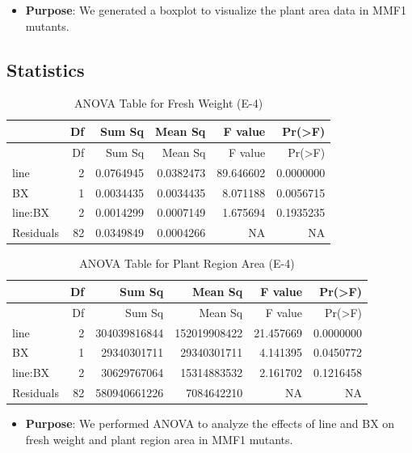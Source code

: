 \documentclass[
  10pt,
]{article}
\providecommand{\tightlist}{%
  \setlength{\itemsep}{0pt}\setlength{\parskip}{0pt}}\usepackage{longtable,booktabs,array}
\begin{document}
\begin{itemize}
\tightlist
\item
  \textbf{Purpose}: We generated a boxplot to visualize the plant area
  data in MMF1 mutants.
\end{itemize}

\subsection{Statistics}\label{statistics-1}

\begin{longtable}[]{@{}lrrrrr@{}}
\caption{ANOVA Table for Fresh Weight (E-4)}\tabularnewline
\toprule\noalign{}
& Df & Sum Sq & Mean Sq & F value & Pr(\textgreater F) \\
\midrule\noalign{}
\endfirsthead
\toprule\noalign{}
& Df & Sum Sq & Mean Sq & F value & Pr(\textgreater F) \\
\midrule\noalign{}
\endhead
\bottomrule\noalign{}
\endlastfoot
line & 2 & 0.0764945 & 0.0382473 & 89.646602 & 0.0000000 \\
BX & 1 & 0.0034435 & 0.0034435 & 8.071188 & 0.0056715 \\
line:BX & 2 & 0.0014299 & 0.0007149 & 1.675694 & 0.1935235 \\
Residuals & 82 & 0.0349849 & 0.0004266 & NA & NA \\
\end{longtable}

\begin{longtable}[]{@{}lrrrrr@{}}
\caption{ANOVA Table for Plant Region Area (E-4)}\tabularnewline
\toprule\noalign{}
& Df & Sum Sq & Mean Sq & F value & Pr(\textgreater F) \\
\midrule\noalign{}
\endfirsthead
\toprule\noalign{}
& Df & Sum Sq & Mean Sq & F value & Pr(\textgreater F) \\
\midrule\noalign{}
\endhead
\bottomrule\noalign{}
\endlastfoot
line & 2 & 304039816844 & 152019908422 & 21.457669 & 0.0000000 \\
BX & 1 & 29340301711 & 29340301711 & 4.141395 & 0.0450772 \\
line:BX & 2 & 30629767064 & 15314883532 & 2.161702 & 0.1216458 \\
Residuals & 82 & 580940661226 & 7084642210 & NA & NA \\
\end{longtable}

\begin{itemize}
\tightlist
\item
  \textbf{Purpose}: We performed ANOVA to analyze the effects of line
  and BX on fresh weight and plant region area in MMF1 mutants.
\end{itemize}
\end{document}
